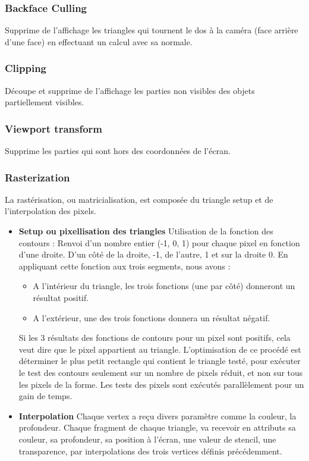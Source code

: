 \subsubsection{Backface Culling}
Supprime de l’affichage les triangles qui  tournent le dos à la caméra (face arrière d’une face) en effectuant un calcul avec sa normale.
\subsubsection{Clipping}
Découpe et supprime de l’affichage les parties non visibles des objets partiellement visibles.
\subsubsection{Viewport transform}
Supprime les parties qui sont hors des coordonnées de l’écran.

\subsubsection{Rasterization}
La rastérisation, ou matricialisation, est composée du triangle setup et de l’interpolation des pixels.
\begin{itemize}
  \item{\textbf{Setup ou pixellisation des triangles}} 
Utilisation de la fonction des contours : Renvoi d’un nombre entier (-1, 0, 1) pour chaque pixel en fonction d’une droite. D’un côté de la droite, -1, de l’autre, 1 et sur la droite 0.
En appliquant cette fonction aux trois segments, nous avons :
\begin{itemize}
	\item A l'intérieur du triangle, les trois fonctions (une par côté) donneront un résultat positif.
	\item A l'extérieur, une des trois fonctions donnera un résultat négatif.
\end{itemize}
Si les 3 résultats des fonctions de contours pour un pixel sont positifs, cela veut dire que le pixel appartient au triangle.
L’optimisation de ce procédé est déterminer le plus petit rectangle qui contient le triangle testé, pour exécuter le test des contours seulement sur un nombre de pixels réduit, et non sur tous les pixels de la forme.
Les tests des pixels sont exécutés parallèlement pour un gain de temps.
\item{\textbf{Interpolation}}
Chaque vertex a reçu divers paramètre comme la couleur, la profondeur. Chaque fragment  de chaque triangle, va recevoir en attributs sa couleur, sa profondeur, sa position à l’écran, une valeur de stencil, une transparence, par interpolations des trois vertices définis précédemment.
\end{itemize}
